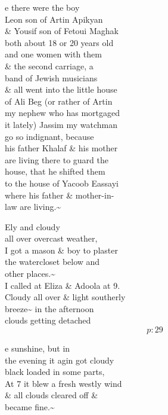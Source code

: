 \documentclass{report}
\begin{document}
	\par{
 	e there were the boy\ \\Leon son of Artin Apikyan\ \\\& Yousif son of Fetoui Maghak\ \\both about 18 or 20 years old\ \\and one women with them\ \\\& the second carriage, a\ \\band of Jewish musicians\ \\\& all went into the little house\ \\of Ali Beg (or rather of Artin\ \\my nephew who has mortgaged\ \\it lately) Jassim my watchman\ \\go so indignant, because\ \\his father Khalaf \& his mother\ \\are living there to guard the\ \\house, that he shifted them\ \\to the house of Yacoob Eassayi\ \\where his father \& mother-in-\ \\law are living.\~{}\ \\
	}


	\par{
 	Ely and cloudy\ \\all over overcast weather,\ \\I got a mason \& boy to plaster\ \\the watercloset below and\ \\other places.\~{}\ \\I called at Eliza \& Adoola at 9.\ \\Cloudy all over \& light southerly\ \\breeze\~{} in the afternoon\ \\clouds getting detached\ \\
  \[p: 29 \]

	}







	\par{
 	e sunshine, but in\ \\the evening it agin got cloudy\ \\black loaded in some parts,\ \\At 7 it blew a fresh westly wind\ \\\& all clouds cleared off \&\ \\became fine.\~{}\ \\
	}
\end{document}
